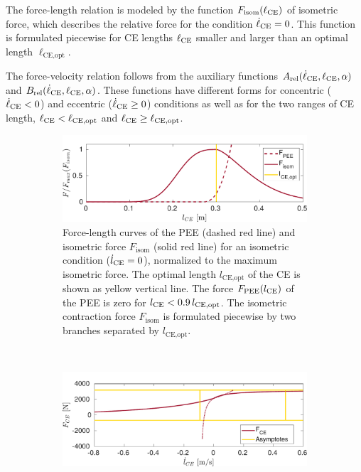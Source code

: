 The force-length relation is modeled by the function $F_\text{isom}(\ell_{\text{CE}})$ of isometric force, which describes the relative force for the condition $\dot{\ell}_{\text{CE}} = 0$. This function is formulated piecewise for CE lengths $\ell_{\text{CE}}$ smaller and larger than an optimal length $\ell_\text{CE,opt}$. 

The force-velocity relation follows from the auxiliary functions $A_\text{rel}(\dot{\ell}_{\text{CE}},\ell_{\text{CE}},\alpha)$ and $B_\text{rel}(\dot{\ell}_{\text{CE}},\ell_{\text{CE}},\alpha)$. These functions have different forms for concentric ($\dot{\ell}_{\text{CE}} < 0$) and eccentric ($\dot{\ell}_{\text{CE}} \geq 0$) conditions as well as for the two ranges of CE  length, $\ell_{\text{CE}} < \ell_\text{CE,opt}$ and $\ell_{\text{CE}} \geq \ell_\text{CE,opt}$.

\begin{figure}%
  \centering%
  \begin{subfigure}[t]{0.9\textwidth}%
    \centering%
    \includegraphics[width=\textwidth]{images/summer_school_study/force_curves_generic_length.pdf}%
    \caption{Force-length curves of the PEE (dashed red line) and isometric force $F_\text{isom}$ (solid red line) for an isometric condition ($\dot{l}_{\text{CE}}=0$), normalized to the maximum isometric force. The optimal length $l_\text{CE,opt}$ of the CE is shown as yellow vertical line. The force $F_\text{PEE}(l_{\text{CE}})$ of the PEE is zero for $l_{\text{CE}} < 0.9\,l_\text{CE,opt}$. The isometric contraction force $F_\text{isom}$ is formulated piecewise by two branches separated by $l_\text{CE,opt}$.}%
    \label{fig:force_curves_generic_length}%
  \end{subfigure}\\[6mm]
  \begin{subfigure}[t]{0.9\textwidth}%
    \centering%
    \includegraphics[width=\textwidth]{images/summer_school_study/force_curves_generic_velocity.pdf}%

\end{subfigure}
\end{figure}
